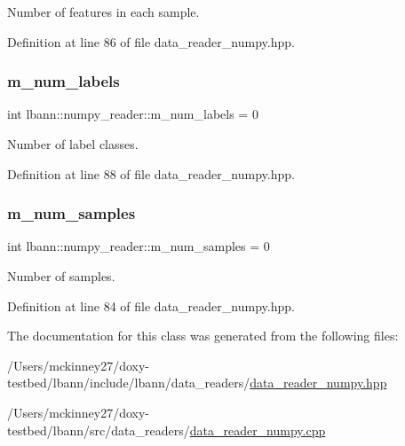 Number of features in each sample. 



Definition at line 86 of file data\+\_\+reader\+\_\+numpy.\+hpp.

\mbox{\label{classlbann_1_1numpy__reader_ab311c3567e1ecc1770a4bc299ab0a3e2}} 
\subsubsection{\texorpdfstring{m\+\_\+num\+\_\+labels}{m\_num\_labels}}
{\footnotesize\ttfamily int lbann\+::numpy\+\_\+reader\+::m\+\_\+num\+\_\+labels = 0\hspace{0.3cm}{\ttfamily [protected]}}



Number of label classes. 



Definition at line 88 of file data\+\_\+reader\+\_\+numpy.\+hpp.

\mbox{\label{classlbann_1_1numpy__reader_a5e0d81c07c950a2d81645566a2ccd965}} 
\subsubsection{\texorpdfstring{m\+\_\+num\+\_\+samples}{m\_num\_samples}}
{\footnotesize\ttfamily int lbann\+::numpy\+\_\+reader\+::m\+\_\+num\+\_\+samples = 0\hspace{0.3cm}{\ttfamily [protected]}}



Number of samples. 



Definition at line 84 of file data\+\_\+reader\+\_\+numpy.\+hpp.



The documentation for this class was generated from the following files\+:\begin{DoxyCompactItemize}
\item 
/\+Users/mckinney27/doxy-\/testbed/lbann/include/lbann/data\+\_\+readers/\hyperlink{data__reader__numpy_8hpp}{data\+\_\+reader\+\_\+numpy.\+hpp}\item 
/\+Users/mckinney27/doxy-\/testbed/lbann/src/data\+\_\+readers/\hyperlink{data__reader__numpy_8cpp}{data\+\_\+reader\+\_\+numpy.\+cpp}\end{DoxyCompactItemize}
